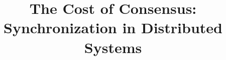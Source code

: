 \documentclass[10pt, conference]{IEEEtran}
\title{The Cost of Consensus: Synchronization in Distributed Systems}
\begin{document}
\maketitle

\begin{abstract}

\end{abstract}

\begin{keywords}
\end{keywords}
















\end{document}

